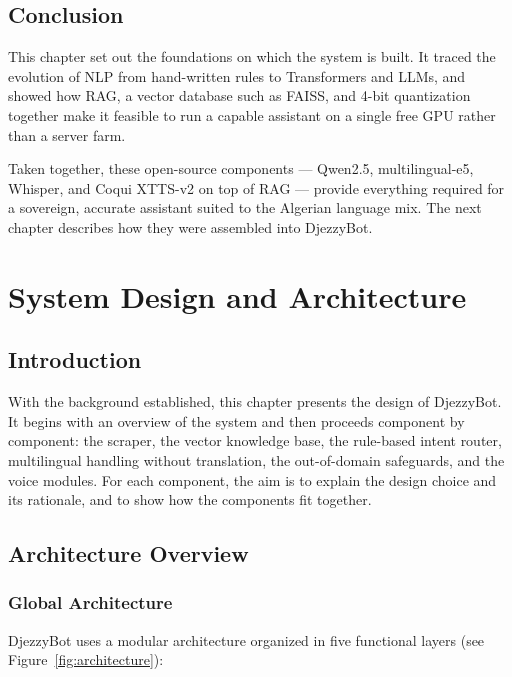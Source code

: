 \documentclass[12pt, a4paper]{report}
\newcommand{\humantext}[1]{#1}      %
\begin{document}
\section{Conclusion}
\humantext{This chapter set out the foundations on which the system is built. It traced the evolution of NLP from hand-written rules to Transformers and LLMs, and showed how RAG, a vector database such as FAISS, and 4-bit quantization together make it feasible to run a capable assistant on a single free GPU rather than a server farm.}

\humantext{Taken together, these open-source components --- Qwen2.5, multilingual-e5, Whisper, and Coqui XTTS-v2 on top of RAG --- provide everything required for a sovereign, accurate assistant suited to the Algerian language mix. The next chapter describes how they were assembled into DjezzyBot.}


\chapter{System Design and Architecture}

\section{Introduction}
\humantext{With the background established, this chapter presents the design of DjezzyBot.} \humantext{It begins with an overview of the system and then proceeds component by component: the scraper, the vector knowledge base, the rule-based intent router, multilingual handling without translation, the out-of-domain safeguards, and the voice modules. For each component, the aim is to explain the design choice and its rationale, and to show how the components fit together.}

\section{Architecture Overview}

\subsection{Global Architecture}
\humantext{DjezzyBot uses a modular architecture organized in five functional layers (see Figure~\ref{fig:architecture}):}
\end{document}
